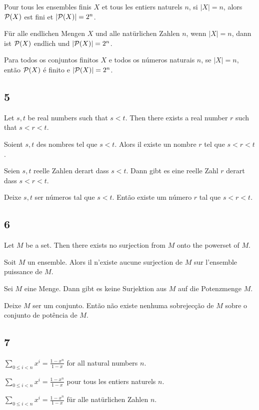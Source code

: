 \documentclass{article}
\newcommand{\pow}{{\cal P}}
\newcommand{\sumgeom}[2]{\sum_{0 \leq i < #2} {#1}^i}
\begin{document}
Pour tous les ensembles finis $ X $ et tous les entiers naturels $ n $, si $ |X| = n $, alors $ \pow(X) $ est fini et $ |\pow(X)| = 2^{n} $.

Für alle endlichen Mengen $ X $ und alle natürlichen Zahlen $ n $, wenn $ |X| = n $, dann ist $ \pow(X) $ endlich und $ |\pow(X)| = 2^{n} $.

Para todos os conjuntos finitos $ X $ e todos os números naturais $ n $, se $ |X| = n $, então $ \pow(X) $ é finito e $ |\pow(X)| = 2^{n} $.

\subsection*{5}

Let $ s, t $ be real numbers such that $ s < t $. Then there exists a real number $ r $ such that $ s < r < t $.

Soient $ s, t $ des nombres tel que $ s < t $. Alors il existe un nombre $ r $ tel que $ s < r < t $.

Seien $ s, t $ reelle Zahlen derart dass $ s < t $. Dann gibt es eine reelle Zahl $ r $ derart dass $ s < r < t $.

Deixe $ s, t $ ser números tal que $ s < t $. Então existe um número $ r $ tal que $ s < r < t $.

\subsection*{6}

Let $ M $ be a set. Then there exists no surjection from $ M $ onto the powerset of $ M $.

Soit $ M $ un ensemble. Alors il n'existe aucune surjection de $ M $ sur l'ensemble puissance de $ M $.

Sei $ M $ eine Menge. Dann gibt es keine Surjektion aus $ M $ auf die Potenzmenge $ M $.

Deixe $ M $ ser um conjunto. Então não existe nenhuma sobrejecção de $ M $ sobre o conjunto de potência de $ M $.

\subsection*{7}

$ \sumgeom{x}{n} = \frac{1 - x^{n}}{1 - x} $ for all natural numbers $ n $.

$ \sumgeom{x}{n} = \frac{1 - x^{n}}{1 - x} $ pour tous les entiers naturels $ n $.

$ \sumgeom{x}{n} = \frac{1 - x^{n}}{1 - x} $ für alle natürlichen Zahlen $ n $.
\end{document}
